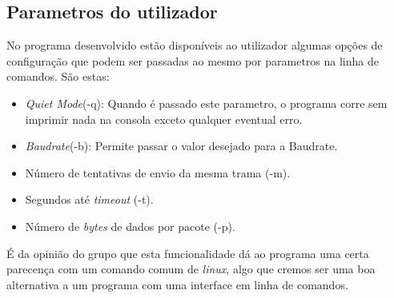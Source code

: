 \documentclass{article}
\begin{document}
\newpage

\subsection{Parametros do utilizador}
No programa desenvolvido estão disponíveis ao utilizador algumas opções de configuração que podem ser passadas ao mesmo por parametros na linha de comandos. São estas:\\
\begin{itemize}
   \item \textit{Quiet Mode}(-q): Quando é passado este parametro, o programa corre sem imprimir nada na consola exceto qualquer eventual erro.%
   \item \textit{Baudrate}(-b): Permite passar o valor desejado para a Baudrate.
   \item Número de tentativas de envio da mesma trama (-m).
   \item Segundos até \textit{timeout} (-t).
   \item Número de \textit{bytes} de dados por pacote (-p).
\end{itemize}

É da opinião do grupo que esta funcionalidade dá ao programa uma certa parecença com um comando comum de \textit{linux}, algo que cremos ser uma boa alternativa a um programa com uma interface em linha de comandos.
\end{document}
